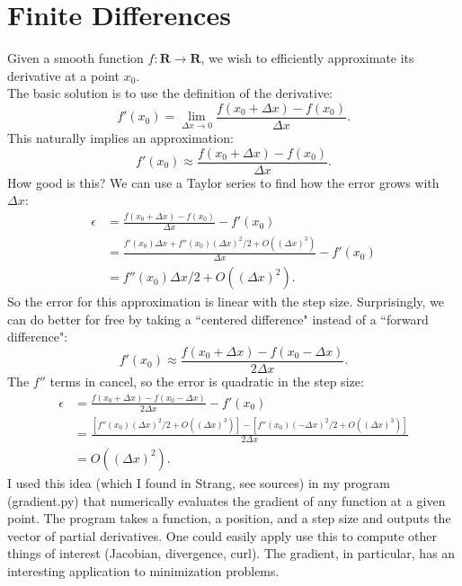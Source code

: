 \documentclass[11pt]{article}
\theoremstyle{plain}
\begin{document}
\section{Finite Differences}
\indent Given a smooth function $f:\mathbf{R}\to\mathbf{R}$, we wish to efficiently approximate its derivative at a point $x_0$. \\
The basic solution is to use the definition of the derivative:
\begin{equation*}
	f'(x_0) = \lim_{\Delta x\to 0}\frac{f(x_0+\Delta x) - f(x_0)}{\Delta x}.
\end{equation*}
This naturally implies an approximation:
\begin{equation*}
	f'(x_0) \approx \frac{f(x_0+\Delta x) - f(x_0)}{\Delta x}.
\end{equation*}
How good is this? We can use a Taylor series to find how the error grows with $\Delta x$:
\begin{align*}
	\epsilon &= \frac{f(x_0+\Delta x) - f(x_0)}{\Delta x} -f'(x_0)\\
	&= \frac{f'(x_0)\Delta x + f''(x_0)(\Delta x)^2/2 + O((\Delta x)^3)}{\Delta x} - f'(x_0) \\
	&= f''(x_0)\Delta x /2 + O((\Delta x)^2).
\end{align*}
So the error for this approximation is linear with the step size. Surprisingly, we can do better for free by taking a ``centered difference" instead of a ``forward difference":
\begin{equation*}
	f'(x_0) \approx \frac{f(x_0+\Delta x) - f(x_0-\Delta x)}{2\Delta x}.
\end{equation*}
The $f''$ terms in cancel, so the error is quadratic in the step size:
\begin{align*}
	\epsilon &= \frac{f(x_0+\Delta x) - f(x_0-\Delta x)}{2\Delta x} - f'(x_0) \\
	&= \frac{[f''(x_0)(\Delta x)^2/2 + O((\Delta x)^3)] - [f''(x_0)(-\Delta x)^2/2 + O((\Delta x)^3)]}{2\Delta x} \\
	&= O((\Delta x)^2).
\end{align*}
I used this idea (which I found in Strang, see sources) in my program (gradient.py) that numerically evaluates the gradient of any function at a given point. The program takes a function, a position, and a step size and outputs the vector of partial derivatives. One could easily apply use this to compute other things of interest (Jacobian, divergence, curl). The gradient, in particular, has an interesting application to minimization problems.
\end{document}
